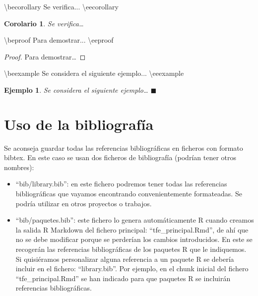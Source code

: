 \documentclass[12pt,a4paper,oneside,]{book}
\newenvironment{Shaded}{\begin{snugshade}}{\end{snugshade}}
\newcommand{\NormalTok}[1]{#1}
\newcommand{\beproof}{\begin{proof}} %
\newcommand{\eeproof}{\end{proof}} %
\newcounter{dummy}
\numberwithin{dummy}{section}
\theoremstyle{ocrenumbox}
\theoremstyle{blacknumex}
\newtheorem{exampleT}{Ejemplo}[chapter] %
\theoremstyle{blacknumbox}
\newtheorem{corollaryT}[dummy]{Corolario}  %
\theoremstyle{ocrenum}
\newenvironment{example}{\begin{exampleT}}{\hfill{\tiny\ensuremath{\blacksquare}}\end{exampleT}}
\newenvironment{corollary}{\begin{cBox}\begin{corollaryT}}{\end{corollaryT}\end{cBox}}
\theoremstyle{ocrenum}
\newcommand{\beexample}{\begin{example}}
\newcommand{\eeexample}{\end{example}}
\newcommand{\becorollary}{\begin{corollary}}
\newcommand{\eecorollary}{\end{corollary}}
\begin{document}
\begin{Shaded}
\begin{Highlighting}[]
\NormalTok{\textbackslash{}becorollary}
\NormalTok{Se verifica...}
\NormalTok{\textbackslash{}eecorollary}
\end{Highlighting}
\end{Shaded}

\becorollary

Se verifica\ldots{} \eecorollary

\begin{Shaded}
\begin{Highlighting}[]
\NormalTok{\textbackslash{}beproof}
\NormalTok{Para demostrar...}
\NormalTok{\textbackslash{}eeproof}
\end{Highlighting}
\end{Shaded}

\beproof

Para demostrar\ldots{} \eeproof

\begin{Shaded}
\begin{Highlighting}[]
\NormalTok{\textbackslash{}beexample}
\NormalTok{Se considera el siguiente ejemplo...}
\NormalTok{\textbackslash{}eeexample}
\end{Highlighting}
\end{Shaded}

\beexample

Se considera el siguiente ejemplo\ldots{} \eeexample

\hypertarget{uso-de-la-bibliografuxeda}{%
\section{Uso de la bibliografía}\label{uso-de-la-bibliografuxeda}}

Se aconseja guardar todas las referencias bibliográficas en ficheros con
formato bibtex. En este caso se usan dos ficheros de bibliografía
(podrían tener otros nombres):

\begin{itemize}
\item
  ``bib/library.bib'': en este fichero podremos tener todas las
  referencias bibliográficas que vayamos encontrando convenientemente
  formateadas. Se podría utilizar en otros proyectos o trabajos.
\item
  ``bib/paquetes.bib'': este fichero lo genera automáticamente R cuando
  creamos la salida R Markdown del fichero principal:
  ``tfe\_principal.Rmd'', de ahí que no se debe modificar porque se
  perderían los cambios introducidos. En este se recogerán las
  referencias bibliográficas de los paquetes R que le indiquemos. Si
  quisiéramos personalizar alguna referencia a un paquete R se debería
  incluir en el fichero: ``library.bib''. Por ejemplo, en el chunk
  inicial del fichero ``tfe\_principal.Rmd'' se han indicado para que
  paquetes R se incluirán referencias bibliográficas.
\end{itemize}
\end{document}
